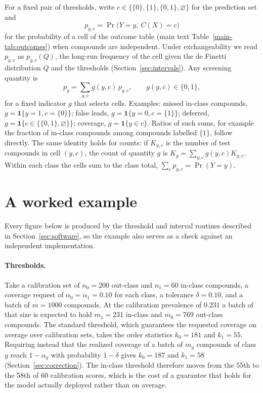 \documentclass[10pt]{article}
\begin{document}
For a fixed pair of thresholds, write $c\in\{\{0\},\{1\},\{0,1\},\varnothing\}$ for the prediction set and
\begin{equation}
p_{y,c}=\Pr\big(Y=y,\ C(X)=c\big)
\end{equation}
for the probability of a cell of the outcome table (main text Table~\ref{main-tab:outcomes}) when compounds are independent. Under exchangeability we read $p_{y,c}$ as $p_{y,c}(Q)$, the long-run frequency of the cell given the de Finetti distribution $Q$ and the thresholds (Section~\ref{sec:intervals}). Any screening quantity is
\begin{equation}
p_g=\sum_{y,c} g(y,c)\,p_{y,c},\qquad g(y,c)\in\{0,1\},
\end{equation}
for a fixed indicator $g$ that selects cells. Examples: missed in-class compounds, $g=\mathbf 1\{y=1,c=\{0\}\}$; false leads, $g=\mathbf 1\{y=0,c=\{1\}\}$; deferred, $g=\mathbf 1\{c\in\{\{0,1\},\varnothing\}\}$; coverage, $g=\mathbf 1\{y\in c\}$. Ratios of such sums, for example the fraction of in-class compounds among compounds labelled $\{1\}$, follow directly. The same identity holds for counts: if $K_{y,c}$ is the number of test compounds in cell $(y,c)$, the count of quantity $g$ is $K_g=\sum_{y,c}g(y,c)K_{y,c}$. Within each class the cells sum to the class total, $\sum_c p_{y,c}=\Pr(Y=y)$.

\section{A worked example}
\label{sec:worked}

Every figure below is produced by the threshold and interval routines described in
Section~\ref{sec:software}, so the example also serves as a check against an independent
implementation.

\paragraph{Thresholds.} Take a calibration set of $n_0=200$ out-class and $n_1=60$ in-class
compounds, a coverage request of $\alpha_0=\alpha_1=0.10$ for each class, a tolerance
$\delta=0.10$, and a batch of $m=1000$ compounds. At the calibration prevalence of $0.231$ a
batch of that size is expected to hold $m_1=231$ in-class and $m_0=769$ out-class compounds.
The standard threshold, which guarantees the requested coverage on average over calibration
sets, takes the order statistics $k_0=181$ and $k_1=55$. Requiring instead that the
realized coverage of a batch of $m_y$ compounds of class $y$ reach $1-\alpha_y$ with
probability $1-\delta$ gives $k_0=187$ and $k_1=58$ (Section~\ref{sec:correction}). The
in-class threshold therefore moves from the 55th to the 58th of 60 calibration scores, which
is the cost of a guarantee that holds for the model actually deployed rather than on average.
\end{document}
